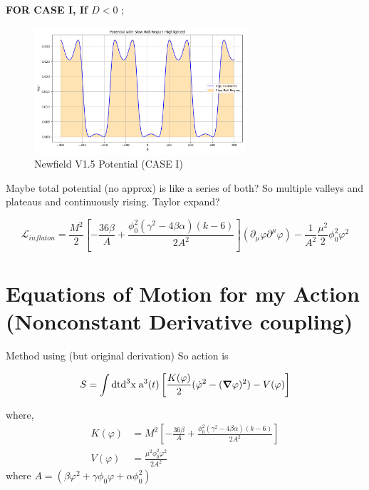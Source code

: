 \documentclass{article}
\begin{document}
\textbf{FOR CASE I, If $D < 0$ };
\begin{figure}[h!]
    \centering
    \includegraphics[width=0.7\textwidth]{Python/Figures/New Potenial CASE I with gravity.png}
    \caption{Newfield V1.5 Potential (CASE I)}
    \label{Newfield V1.5 as func of N}
\end{figure}

Maybe total potential (no approx) is like a series of both? So multiple valleys and plateaus and continuously rising. Taylor expand?

\begin{equation}
    \mathcal{L}_{inflaton} = \frac{M^2}{2} \left[-\frac{36\beta}{A} + \frac{\phi_0^2 (\gamma^2 - 4\beta\alpha)(k-6)}{2 A^2}\right] (\partial_\mu \varphi \partial^\mu \varphi) -  \frac{1}{A^2} \frac{\mu^2}{2} \phi^2_0 \varphi^2 
\end{equation}

\section{Equations of Motion for my Action (Nonconstant Derivative coupling)}
Method using \cite{Baumann_2022} (but original derivation)  
So action is

\begin{equation} \label{44}
    S = \int \text{dt}\text{d}^3\text{x} \; \text{a}^3(t) \left[ \frac{K(\varphi)}{2}(\dot{\varphi}^2 - (\grad \varphi)^2) - V(\varphi) \right]
\end{equation}

where,
\begin{align}
    K(\varphi) &= M^2 \left[-\frac{36\beta}{A} + \frac{\phi_0^2 (\gamma^2 - 4\beta\alpha)(k-6)}{2 A^2}\right] \nonumber \\
    V(\varphi) &=  \frac{\mu^2 \phi_0^2 \varphi^2}{2 A^2}
\end{align}
where $A = (\beta \varphi^2  +\gamma \phi_0 \varphi +\alpha \phi^2_0)$
\end{document}

